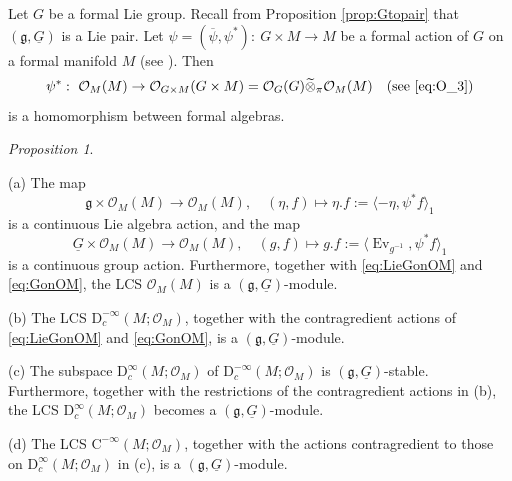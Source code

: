 \documentclass[12pt, a4paper]{amsart}
\newcommand{\CO}{{\mathcal {O}}}
\newcommand{\RC}{{\mathrm {C}}}
\newcommand{\RD}{{\mathrm {D}}}
\newcommand{\wt}{\widetilde}
\newcommand{\wh}{\widehat}
\newcommand{\Ev}{\operatorname{Ev}}
\newcommand{\g}{\mathfrak g}
\newcommand{\la}{\langle}
\newcommand{\ra}{\rangle}
\newcommand{\be}{\begin {equation}}
\newcommand{\ee}{\end {equation}}
\newcommand{\qaq}{\quad\textrm{and}\quad}
\theoremstyle{Theorem}
\theoremstyle{Theorem}
\theoremstyle{Theorem}
\theoremstyle{Theorem}
\theoremstyle{Plain}
\theoremstyle{remark}
\theoremstyle{remark}
\theoremstyle{Definition}
\newtheorem{prpd}[dfn]{Proposition}
\numberwithin{equation}{section}
\begin{document}

Let $G$ be a formal Lie group. Recall from Proposition \ref{prop:Gtopair} that $(\g,\underline{G})$ is a Lie pair. Let  $\psi=(\overline{\psi},\psi^*): \ G\times M\rightarrow M$ be a formal action of $G$ on a formal manifold $M$ (see \cite[Definition 4.1]{CSW4}).
Then 
\[\psi^*: \ \CO_M(M)\rightarrow \CO_{G\times M}(G\times M)=\CO_G(G)\wt\otimes_{\pi}\CO_M(M) \quad\text{(see \eqref{eq:O_3})}\] is a homomorphism  between formal algebras. 
\begin{prpd}\label{prop:modofgG} %

 \noindent(a) The map   \be\label{eq:LieGonOM} \g\times\CO_M(M)\rightarrow \CO_M(M), \quad (\eta, f)\mapsto \eta.f :=\la -\eta , \psi^*f\ra_1\ee is a continuous Lie algebra action,
	and the map \be\label{eq:GonOM}  \underline G\times\CO_M(M)\rightarrow \CO_M(M), \quad (g,f)\mapsto g.f:=\la \Ev_{g^{-1}}, \psi^*f\ra_1\ee is a continuous group action. Furthermore, together with \eqref{eq:LieGonOM} and \eqref{eq:GonOM}, the LCS $\CO_M(M)$ is a $(\g, \underline G)$-module.
    
 \noindent(b) The LCS $\RD^{-\infty}_c(M;\CO_M)$, together with 
 the contragredient actions of \eqref{eq:LieGonOM} and \eqref{eq:GonOM}, is a $(\g, \underline G)$-module. %
 
 \noindent(c) The subspace $\RD^{\infty}_c(M;\CO_M)$ of $\RD^{-\infty}_c(M;\CO_M)$ is $(\g, \underline G)$-stable. Furthermore, together with the restrictions of the contragredient actions
in (b),  the LCS $\RD^{\infty}_c(M;\CO_M)$ becomes a $(\g, \underline G)$-module.

  \noindent(d)
    The LCS $\RC^{-\infty}(M;\CO_M)$, together with the actions
contragredient to those on $\RD^{\infty}_c(M;\CO_M)$ in (c),  %
    is a $(\g, \underline G)$-module. %

\end{prpd}
\end{document}
